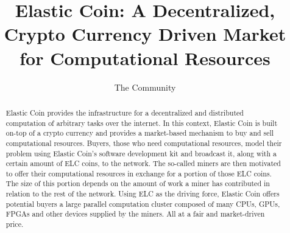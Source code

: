\documentclass{sig-alternate}
\begin{document}



\title{Elastic Coin: A Decentralized, Crypto Currency Driven Market for Computational Resources}



\author{
\alignauthor%
The Community
}

\maketitle
\begin{abstract}
Elastic Coin provides the infrastructure for a decentralized and distributed computation of arbitrary tasks over the internet.
In this context, Elastic Coin is built on-top of a crypto currency and provides a market-based mechanism to buy and sell computational resources. Buyers, those who need computational resources, model their problem using Elastic Coin's software development kit and broadcast it, along with a certain amount of ELC coins, to the network. The so-called miners are then motivated to offer their computational resources in exchange for a portion of those ELC coins. The size of this portion depends on the amount of work a miner has contributed in relation to the rest of the network. Using ELC as the driving force, Elastic Coin offers potential buyers a large parallel computation cluster composed of many CPUs, GPUs, FPGAs and other devices supplied by the miners. All at a fair and market-driven price.

\end{abstract}
\end{document}
